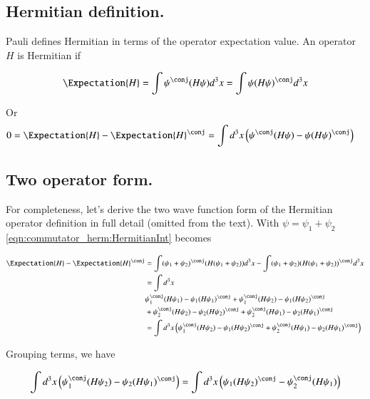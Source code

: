 \subsection{Hermitian definition. }

Pauli defines Hermitian in terms of the operator expectation value.  An operator $H$ is Hermitian if

\begin{align}\label{eqn:commutator_herm:Hermitian}
\Expectation{H} = \int \psi^\conj (H \psi) d^3 x = \int \psi (H \psi)^\conj d^3 x
\end{align}

Or
\begin{align}\label{eqn:commutator_herm:HermitianInt}
0 &= \Expectation{H} - \Expectation{H}^\conj = \int d^3 x \left( \psi^\conj (H \psi) - \psi (H \psi)^\conj \right)
\end{align}

\subsection{Two operator form. }

For completeness, let's derive the two wave function form of the Hermitian operator definition in full detail (omitted from the text).  With $\psi = \psi_1 + \psi_2$
\ref{eqn:commutator_herm:HermitianInt} becomes

\begin{align*}
\Expectation{H} - \Expectation{H}^\conj
&= \int (\psi_1 + \psi_2)^\conj (H (\psi_1 + \psi_2)) d^3 x - \int (\psi_1 + \psi_2) (H (\psi_1 + \psi_2))^\conj d^3 x \\
&= \int d^3 x \\
&\psi_1^\conj (H \psi_1) - \psi_1 (H \psi_1)^\conj 
+\psi_1^\conj (H \psi_2) - \psi_1 (H \psi_2)^\conj \\
&+\psi_2^\conj (H \psi_2) - \psi_2 (H \psi_2)^\conj 
+\psi_2^\conj (H \psi_1) - \psi_2 (H \psi_1)^\conj \\
&= \int d^3 x
\left( \psi_1^\conj (H \psi_2) - \psi_1 (H \psi_2)^\conj 
+\psi_2^\conj (H \psi_1) - \psi_2 (H \psi_1)^\conj \right) \\
\end{align*}

Grouping terms, we have 

\begin{align*}
\int d^3 x \left( \psi_1^\conj (H \psi_2) - \psi_2 (H \psi_1)^\conj \right) = \int d^3 x \left( \psi_1 (H \psi_2)^\conj - \psi_2^\conj (H \psi_1) \right)
\end{align*}

